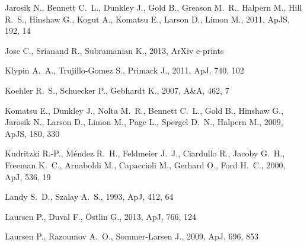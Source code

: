 \documentclass[usenatbib]{mn2e}
\newcommand{\apj}{ApJ}
\newcommand{\apjs}{ApJS}
\newcommand{\aap}{A\&A}
\begin{document}
\begin{thebibliography}{}
{Jarosik} N.,  {Bennett} C.~L.,  {Dunkley} J.,  {Gold} B.,  {Greason} M.~R.,
  {Halpern} M.,  {Hill} R.~S.,  {Hinshaw} G.,  {Kogut} A.,  {Komatsu} E.,
  {Larson} D.,    {Limon} M.,  2011, \apjs, 192, 14

{Jose} C.,  {Srianand} R.,    {Subramanian} K.,  2013, ArXiv e-prints

{Klypin} A.~A.,  {Trujillo-Gomez} S.,    {Primack} J.,  2011, \apj, 740, 102

{Koehler} R.~S.,  {Schuecker} P.,    {Gebhardt} K.,  2007, \aap, 462, 7

{Komatsu} E.,  {Dunkley} J.,  {Nolta} M.~R.,  {Bennett} C.~L.,  {Gold} B.,
  {Hinshaw} G.,  {Jarosik} N.,  {Larson} D.,  {Limon} M.,  {Page} L.,
  {Spergel} D.~N.,    {Halpern} M.,  2009, \apjs, 180, 330

{Kudritzki} R.-P.,  {M{\'e}ndez} R.~H.,  {Feldmeier} J.~J.,  {Ciardullo} R.,
  {Jacoby} G.~H.,  {Freeman} K.~C.,  {Arnaboldi} M.,  {Capaccioli} M.,
  {Gerhard} O.,    {Ford} H.~C.,  2000, \apj, 536, 19

{Landy} S.~D.,  {Szalay} A.~S.,  1993, \apj, 412, 64

{Laursen} P.,  {Duval} F.,    {{\"O}stlin} G.,  2013, \apj, 766, 124

{Laursen} P.,  {Razoumov} A.~O.,    {Sommer-Larsen} J.,  2009, \apj, 696, 853


\end{thebibliography}
\end{document}
